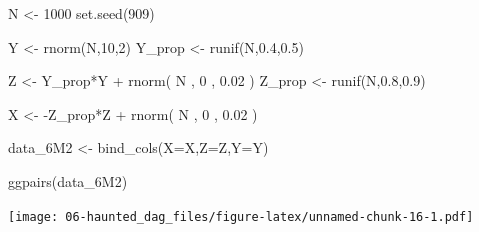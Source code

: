 \documentclass[
]{book}
\newenvironment{Shaded}{\begin{snugshade}}{\end{snugshade}}
\newcommand{\AttributeTok}[1]{\textcolor[rgb]{0.77,0.63,0.00}{#1}}
\newcommand{\DecValTok}[1]{\textcolor[rgb]{0.00,0.00,0.81}{#1}}
\newcommand{\FloatTok}[1]{\textcolor[rgb]{0.00,0.00,0.81}{#1}}
\newcommand{\FunctionTok}[1]{\textcolor[rgb]{0.00,0.00,0.00}{#1}}
\newcommand{\NormalTok}[1]{#1}
\newcommand{\OtherTok}[1]{\textcolor[rgb]{0.56,0.35,0.01}{#1}}
\newcommand{\SpecialCharTok}[1]{\textcolor[rgb]{0.00,0.00,0.00}{#1}}
\begin{document}
\begin{Shaded}
\begin{Highlighting}[]
\NormalTok{N }\OtherTok{\textless{}{-}} \DecValTok{1000} 
\FunctionTok{set.seed}\NormalTok{(}\DecValTok{909}\NormalTok{) }

\NormalTok{Y }\OtherTok{\textless{}{-}} \FunctionTok{rnorm}\NormalTok{(N,}\DecValTok{10}\NormalTok{,}\DecValTok{2}\NormalTok{)}
\NormalTok{Y\_prop }\OtherTok{\textless{}{-}} \FunctionTok{runif}\NormalTok{(N,}\FloatTok{0.4}\NormalTok{,}\FloatTok{0.5}\NormalTok{) }

\NormalTok{Z }\OtherTok{\textless{}{-}}\NormalTok{ Y\_prop}\SpecialCharTok{*}\NormalTok{Y }\SpecialCharTok{+} \FunctionTok{rnorm}\NormalTok{( N , }\DecValTok{0}\NormalTok{ , }\FloatTok{0.02}\NormalTok{ )}
\NormalTok{Z\_prop }\OtherTok{\textless{}{-}} \FunctionTok{runif}\NormalTok{(N,}\FloatTok{0.8}\NormalTok{,}\FloatTok{0.9}\NormalTok{) }

\NormalTok{X }\OtherTok{\textless{}{-}} \SpecialCharTok{{-}}\NormalTok{Z\_prop}\SpecialCharTok{*}\NormalTok{Z }\SpecialCharTok{+} \FunctionTok{rnorm}\NormalTok{( N , }\DecValTok{0}\NormalTok{ , }\FloatTok{0.02}\NormalTok{ )}

\NormalTok{data\_6M2 }\OtherTok{\textless{}{-}} \FunctionTok{bind\_cols}\NormalTok{(}\AttributeTok{X=}\NormalTok{X,}\AttributeTok{Z=}\NormalTok{Z,}\AttributeTok{Y=}\NormalTok{Y)}

\FunctionTok{ggpairs}\NormalTok{(data\_6M2)}
\end{Highlighting}
\end{Shaded}

\texttt{[image: 06-haunted\_dag\_files/figure-latex/unnamed-chunk-16-1.pdf]}
\end{document}
